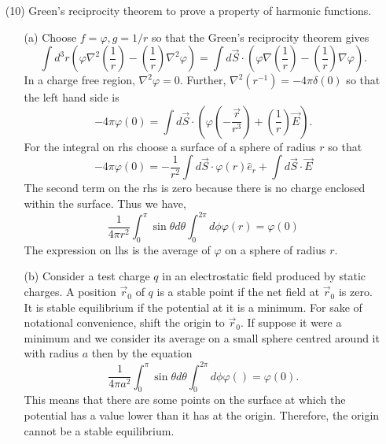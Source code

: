 \documentclass{article}
\newcommand{\uv}[1]{\hat{e}_{#1}}
\newcommand{\grad}[1]{\nabla{#1}}
\begin{document}
\begin{enumerate}
\item[(10)] Green's reciprocity theorem to prove a property of harmonic functions.
\begin{enumerate}
\item[(a)] Choose $f = \varphi, g = 1/r$ so that the Green's reciprocity theorem gives
\[
\int d^3 r\left(\varphi\nabla^2\left(\frac{1}{r}\right) - \left(\frac{1}{r}\right)\nabla^2\varphi\right)
= \int d\vec{S}\cdot\left(\varphi\grad{\left(\frac{1}{r}\right)} - \left(\frac{1}{r}\right)\grad\varphi\right).
\]
In a charge free region, $\nabla^2\varphi = 0$. Further, $\nabla^2(r^{-1}) = 
-4\pi\delta(0)$ so that the left hand side is
\[
-4\pi\varphi(0) = \int d\vec{S}\cdot\left(\varphi\left(-\frac{\vec{r}}{r^3}\right) +
\left(\frac{1}{r}\right)\vec{E}\right).
\]
For the integral on rhs choose a surface of a sphere of radius $r$ so that
\[
-4\pi\varphi(0) = -\frac{1}{r^2}\int d\vec{S}\cdot\varphi(r)\uv{r} +
\int d\vec{S}\cdot\vec{E}
\]
The second term on the rhs is zero because there is no charge enclosed within the
surface. Thus we have,
\[
\frac{1}{4\pi r^2}\int_0^\pi \sin\theta d\theta\int_0^{2\pi}d\phi\varphi(r) = \varphi(0)
\]
The expression on lhs is the average of $\varphi$ on a sphere of radius $r$.

\item[(b)] Consider a test charge $q$ in an electrostatic field produced by static
charges. A position $\vec{r}_0$ of $q$ is a stable point if the net field at $\vec{r}_0$
is zero. It is stable equilibrium if the potential at it is a minimum. For sake of
notational convenience, shift the origin to $\vec{r}_0$. If suppose it were a minimum 
and we consider its average on a small sphere centred around it with radius $a$ then
by the equation
\[
\frac{1}{4\pi a^2}\int_0^\pi \sin\theta d\theta\int_0^{2\pi}d\phi\varphi() = \varphi(0).
\]
This means that there are some points on the surface at which the potential has
a value lower than it has at the origin. Therefore, the origin cannot be a stable
equilibrium.
\end{enumerate}


\end{enumerate}
\end{document}
